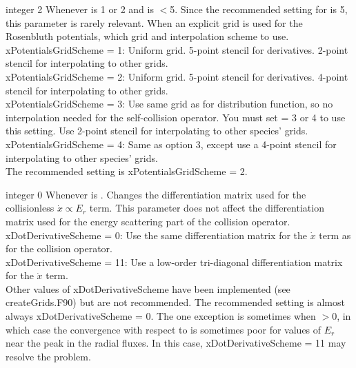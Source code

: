 \myhrule

{integer}
{2}
{Whenever  is 1 or 2 and  is $<$5.
Since the recommended setting for  is 5, this parameter is rarely relevant.}
{When an explicit grid is used for the Rosenbluth potentials, which grid and interpolation scheme to use.\\

{\ttfamily xPotentialsGridScheme} = 1: Uniform grid. 5-point stencil for derivatives. 2-point stencil for interpolating to other grids.\\

{\ttfamily xPotentialsGridScheme} = 2: Uniform grid. 5-point stencil for derivatives. 4-point stencil for interpolating to other grids.\\

{\ttfamily xPotentialsGridScheme} = 3: Use same grid as for distribution function, so no interpolation needed for the self-collision operator.
  You must set  = 3 or 4 to use this setting.  Use 2-point stencil for interpolating to other species' grids.\\

{\ttfamily xPotentialsGridScheme} = 4: Same as option 3, except use a 4-point stencil for interpolating to other species' grids.\\

The recommended setting is {\ttfamily xPotentialsGridScheme} = 2.}

\myhrule

{integer}
{0}
{Whenever  is \true.}
{Changes the differentiation matrix used for the collisionless $\dot{x} \propto E_r$ term. This parameter
does not affect the differentiation matrix used for the energy scattering part of the collision operator.\\

{\ttfamily xDotDerivativeScheme} = 0: Use the same differentiation matrix for the $\dot{x}$ term as for the collision operator.\\

{\ttfamily xDotDerivativeScheme} = 11: Use a low-order tri-diagonal differentiation matrix for the $\dot{x}$ term.\\

Other values of {\ttfamily xDotDerivativeScheme} have been implemented (see {\ttfamily createGrids.F90}) but are
not recommended. The recommended setting is almost always {\ttfamily xDotDerivativeScheme} = 0.
The one exception is sometimes when $>0$, in which
case the convergence with respect to  is sometimes poor for values of $E_r$ near the peak in the radial fluxes.
In this case, {\ttfamily xDotDerivativeScheme} = 11 may resolve the problem.
}

